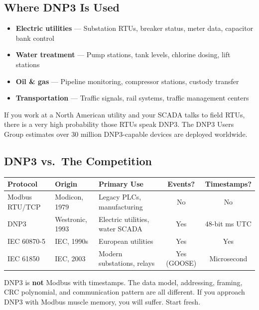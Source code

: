 \documentclass[11pt,twoside]{article}
\begin{document}
\subsection{Where DNP3 Is Used}

\begin{itemize}[noitemsep]
  \item \textbf{Electric utilities} --- Substation RTUs, breaker status, meter data, capacitor bank control
  \item \textbf{Water treatment} --- Pump stations, tank levels, chlorine dosing, lift stations
  \item \textbf{Oil \& gas} --- Pipeline monitoring, compressor stations, custody transfer
  \item \textbf{Transportation} --- Traffic signals, rail systems, traffic management centers
\end{itemize}

If you work at a North American utility and your SCADA talks to field RTUs, there is a very high probability those RTUs speak DNP3. The DNP3 Users Group estimates over 30 million DNP3-capable devices are deployed worldwide.

\subsection{DNP3 vs.\ The Competition}

\begin{tabularx}{\textwidth}{lXXcc}
\toprule
\textbf{Protocol} & \textbf{Origin} & \textbf{Primary Use} & \textbf{Events?} & \textbf{Timestamps?}\\
\midrule
Modbus RTU/TCP & Modicon, 1979 & Legacy PLCs, manufacturing & No & No \\
DNP3 & Westronic, 1993 & Electric utilities, water SCADA & Yes & 48-bit ms UTC \\
IEC 60870-5 & IEC, 1990s & European utilities & Yes & Yes \\
IEC 61850 & IEC, 2003 & Modern substations, relays & Yes (GOOSE) & Microsecond \\
\bottomrule
\end{tabularx}

\begin{warnbox}
DNP3 is \textbf{not} Modbus with timestamps. The data model, addressing, framing, CRC polynomial, and communication pattern are all different. If you approach DNP3 with Modbus muscle memory, you will suffer. Start fresh.
\end{warnbox}
\end{document}
